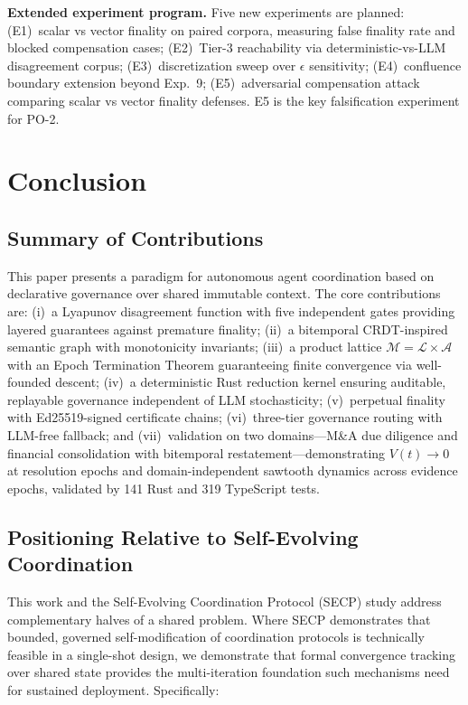 \documentclass[11pt]{article}
\begin{document}
\textbf{Extended experiment program.} Five new experiments are planned: (E1)~scalar vs vector finality on paired corpora, measuring false finality rate and blocked compensation cases; (E2)~Tier-3 reachability via deterministic-vs-LLM disagreement corpus; (E3)~discretization sweep over $\epsilon$ sensitivity; (E4)~confluence boundary extension beyond Exp.~9; (E5)~adversarial compensation attack comparing scalar vs vector finality defenses. E5 is the key falsification experiment for PO-2.

\section{Conclusion}

\subsection{Summary of Contributions}

This paper presents a paradigm for autonomous agent coordination based on declarative governance over shared immutable context. The core contributions are: (i)~a Lyapunov disagreement function with five independent gates providing layered guarantees against premature finality; (ii)~a bitemporal CRDT-inspired semantic graph with monotonicity invariants; (iii)~a product lattice $\mathcal{M} = \mathcal{L} \times \mathcal{A}$ with an Epoch Termination Theorem guaranteeing finite convergence via well-founded descent; (iv)~a deterministic Rust reduction kernel ensuring auditable, replayable governance independent of LLM stochasticity; (v)~perpetual finality with Ed25519-signed certificate chains; (vi)~three-tier governance routing with LLM-free fallback; and (vii)~validation on two domains---M\&A due diligence and financial consolidation with bitemporal restatement---demonstrating $V(t) \to 0$ at resolution epochs and domain-independent sawtooth dynamics across evidence epochs, validated by 141 Rust and 319 TypeScript tests.

\subsection{Positioning Relative to Self-Evolving Coordination}

This work and the Self-Evolving Coordination Protocol (SECP) study \cite{delachica2026} address complementary halves of a shared problem. Where SECP demonstrates that bounded, governed self-modification of coordination protocols is technically feasible in a single-shot design, we demonstrate that formal convergence tracking over shared state provides the multi-iteration foundation such mechanisms need for sustained deployment. Specifically:
\end{document}
